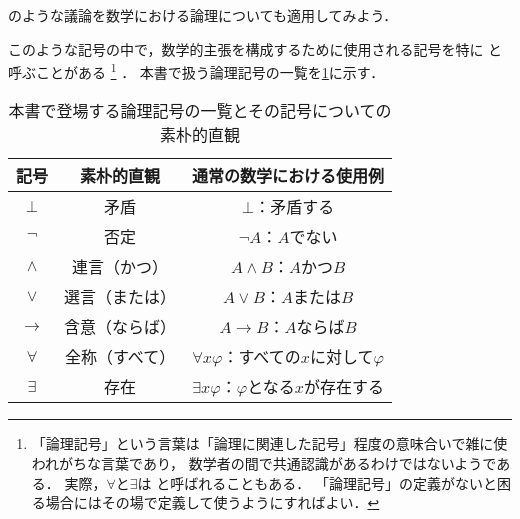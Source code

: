 のような議論を数学における論理についても適用してみよう．


このような記号の中で，数学的主張を構成するために使用される記号を特に%
%
と呼ぶことがある%
\footnote{%
	「論理記号」という言葉は「論理に関連した記号」程度の意味合いで雑に使われがちな言葉であり，
	数学者の間で共通認識があるわけではないようである．
	実際，\(\forall\)と\(\exists\)は%
	と呼ばれることもある．
	「論理記号」の定義がないと困る場合にはその場で定義して使うようにすればよい．
}%
．
本書で扱う論理記号の一覧を\cref{tab:logicalsymbol}に示す．

\begin{table}[htbp]
	\centering
	\caption{本書で登場する論理記号の一覧とその記号についての素朴的直観}
	\label{tab:logicalsymbol}
	\begin{tabular}{ccc}
		\toprule
		記号          & 素朴的直観   & 通常の数学における使用例                                   \\
		\midrule
		\(\bot\)    & 矛盾      & \(\bot\)：矛盾する                                  \\
		\(\lnot\)   & 否定      & \(\lnot A\)：\(A\)でない                           \\
		\(\land\)   & 連言（かつ）  & \(A \land B\)：\(A\)かつ\(B\)                     \\
		\(\lor\)    & 選言（または） & \(A \lor B\)：\(A\)または\(B\)                     \\
		\(\to\)     & 含意（ならば） & \(A \to B\)：\(A\)ならば\(B\)                      \\
		\(\forall\) & 全称（すべて） & \(\forall x \varphi\)：すべての\(x\)に対して\(\varphi\) \\
		\(\exists\) & 存在      & \(\exists x \varphi\)：\(\varphi\)となる\(x\)が存在する \\
		\bottomrule
	\end{tabular}
\end{table}

